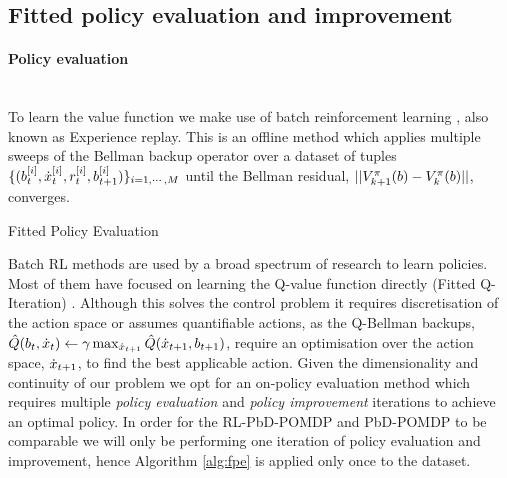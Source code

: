 
\subsection{Fitted policy evaluation and improvement}\label{sec:fpe}

\paragraph{Policy evaluation}\\

To learn the value function we make use of batch reinforcement learning \cite{EGW05}, also known as Experience replay.
This is an offline method which applies multiple sweeps of the Bellman backup operator 
over a dataset of tuples $\{(b^{[i]}_t,\dot{x}^{[i]}_t,r^{[i]}_{t},b^{[i]}_{t+1})\}_{i=1,\cdots,M}$ until the Bellman residual,
$||V^{\pi}_{k+1}(b) - V^{\pi}_{k}(b)||$, converges. 

\begin{center}
\begin{minipage}{.65\linewidth}
\begin{algorithm}[H]
\label{alg:fpe}
\BlankLine
{}
\caption{Fitted Policy Evaluation}
\end{algorithm} 
\end{minipage}
\end{center}
Batch RL methods are used by a broad spectrum of research to learn policies. 
Most of them have focused on learning the Q-value function directly (Fitted Q-Iteration) 
\cite{NIPS2008_3501,EGW05,Riedmiller2005}. Although this solves the control problem it requires discretisation 
of the action space or assumes quantifiable actions, as the 
Q-Bellman backups, $\hat{Q}(b_t,\dot{x}_t) \leftarrow \gamma \max_{\dot{x}_{t+1}} \hat{Q}(\dot{x}_{t+1},b_{t+1})$, 
require an optimisation over the action space, $\dot{x}_{t+1}$, to find the best applicable action. 
Given the dimensionality and continuity of our problem we opt for an on-policy evaluation method
which requires multiple \textit{policy evaluation} and \textit{policy improvement} iterations to achieve an optimal policy.
In order for the RL-PbD-POMDP and PbD-POMDP to be comparable we will only be performing one iteration of policy evaluation
and improvement, hence Algorithm \ref{alg:fpe} is applied only once to the dataset.

